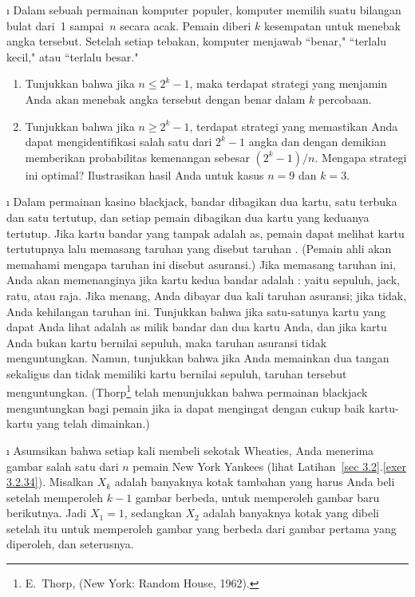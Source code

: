 \begin{LJSItem}
\i\label{exer 6.1.28} Dalam sebuah permainan komputer populer, komputer memilih suatu bilangan bulat
dari~1 sampai~$n$ secara acak. Pemain diberi $k$ kesempatan untuk menebak angka tersebut. Setelah
setiap tebakan, komputer menjawab ``benar," ``terlalu kecil," atau ``terlalu besar."

\begin{enumerate}
\item Tunjukkan bahwa jika $n \leq 2^k - 1$, maka terdapat strategi yang menjamin Anda
akan menebak angka tersebut dengan benar dalam $k$ percobaan.

\item Tunjukkan bahwa jika $n \geq 2^k - 1$, terdapat strategi yang memastikan Anda
dapat mengidentifikasi salah satu dari $2^k - 1$ angka dan dengan demikian memberikan probabilitas kemenangan sebesar $(2^k - 1)/n$.
Mengapa strategi ini optimal? Ilustrasikan hasil Anda untuk
kasus $n = 9$ dan $k = 3$.
\end{enumerate}

\i\label{exer 6.1.29} Dalam permainan kasino blackjack, bandar dibagikan dua
kartu, satu terbuka dan satu tertutup, dan setiap pemain dibagikan dua kartu yang keduanya
tertutup. Jika kartu bandar yang tampak adalah as, pemain dapat melihat kartu tertutupnya lalu
memasang taruhan yang disebut taruhan . (Pemain ahli akan memahami mengapa taruhan ini
disebut asuransi.) Jika memasang taruhan ini, Anda akan memenanginya jika kartu kedua
bandar adalah : yaitu sepuluh, jack, ratu, atau raja. Jika menang, Anda
dibayar dua kali taruhan asuransi; jika tidak, Anda kehilangan taruhan ini. Tunjukkan bahwa jika satu-satunya
kartu yang dapat Anda lihat adalah as milik bandar dan dua kartu Anda, dan jika kartu Anda bukan
kartu bernilai sepuluh, maka taruhan asuransi tidak menguntungkan. Namun, tunjukkan bahwa jika Anda
memainkan dua tangan sekaligus dan tidak memiliki kartu bernilai sepuluh, taruhan tersebut
menguntungkan. (Thorp\footnote{E.~Thorp,   (New York: Random
House, 1962).} telah menunjukkan bahwa permainan blackjack menguntungkan bagi pemain jika ia dapat
mengingat dengan cukup baik kartu-kartu yang telah dimainkan.)

\i\label{exer 6.1.30} Asumsikan bahwa setiap kali membeli sekotak Wheaties, Anda
menerima gambar salah satu dari $n$ pemain New York Yankees (lihat
Latihan~\ref{sec 3.2}.\ref{exer 3.2.34}). Misalkan $X_k$ adalah
banyaknya kotak tambahan yang harus Anda beli setelah memperoleh $k - 1$ gambar berbeda,
untuk memperoleh gambar baru berikutnya. Jadi $X_1 = 1$, sedangkan $X_2$ adalah banyaknya
kotak yang dibeli setelah itu untuk memperoleh gambar yang berbeda dari gambar pertama yang
diperoleh, dan seterusnya.


\end{LJSItem}
